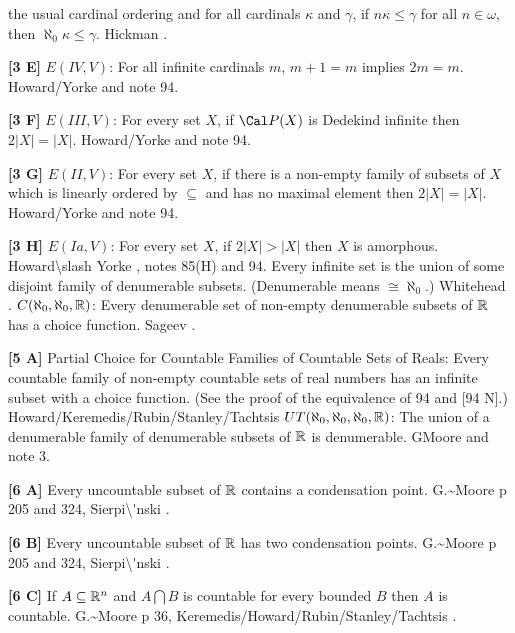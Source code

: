 the usual cardinal ordering and for all cardinals $\kappa$ and $\gamma$,
if $n\kappa  \le  \gamma $ for all $n \in  \omega $, then
$\aleph _{0}\kappa  \le  \gamma $.  \ac{Hickman} \cite{1979b}.
\smallskip
\item{}{\bf [3 E]} $E(IV,V)$: For all infinite cardinals $m$, $m + 1 = m$
implies $2m= m$.  \ac{Howard/Yorke} \cite{1989} and note 94.
\smallskip
\item{}{\bf [3 F]} $E(III,V)$: For every set $X$, if $\Cal P(X)$ is
Dedekind infinite then $2|X| = |X|$.  \ac{Howard/Yorke} \cite{1989} and
note 94.
\smallskip
\item{}{\bf [3 G]} $E(II,V)$:  For every set $X$, if there is a non-empty
family of subsets of $X$ which is linearly ordered by $\subseteq$ and
has no maximal element then $2|X| = |X|$. \ac{Howard/Yorke} \cite{1989} and
note 94.
\smallskip
\item{}{\bf [3 H]} $E(Ia,V)$: For every set $X$, if $2|X| > |X|$ then $X$
is amorphous.  \ac{Howard\slash Yorke} \cite{1989}, notes 85(H) and 94.
\medskip
{} Every infinite set is the union of some disjoint
family of denumerable subsets. (Denumerable means $\cong \aleph_0$.)
\ac{Whitehead} \cite{1902}.
\medskip
{} $C(\aleph_0,\aleph_0,\Bbb R)$: Every denumerable
set of non-empty denumerable subsets of ${\Bbb R}$ has a choice function.
\ac{Sageev} \cite{1975}.
\smallskip
\item{}{\bf [5 A]} Partial Choice for Countable Families of
Countable Sets of Reals: Every countable family of non-empty
countable sets of real numbers has an infinite subset with a
choice function. (See the proof of the equivalence of 94
and [94 N].) \ac{Howard/Keremedis/Rubin/Stanley/Tachtsis} \cite{1999}
\medskip
{} $UT(\aleph_0,\aleph_0,\aleph_0,\Bbb R)$: The
union of a denumerable  family  of denumerable subsets of ${\Bbb R}$ is
denumerable. G\. \ac{Moore} \cite{1982} and note 3.
\smallskip
\item{}{\bf [6 A]}  Every uncountable subset of ${\Bbb R}$ contains a
condensation point. \ac{G.~Moore} \cite{1982} p 205 and 324,
\ac{Sierpi\'nski} \cite{1918}.
\smallskip
\item{}{\bf [6 B]}  Every uncountable subset of ${\Bbb R}$ has two
condensation points.  \ac{G.~Moore} \cite{1982} p 205 and 324,
\ac{Sierpi\'nski} \cite{1918}.
\smallskip
\item{}{\bf [6 C]} If $A\subseteq{\Bbb R}^n$ and $A\bigcap B$ is
countable for every bounded $B$ then $A$ is countable. \ac{G.~Moore}
\cite{1982} p 36, \ac{Keremedis/Howard/Rubin/Stanley/Tachtsis} \cite{1999}.
